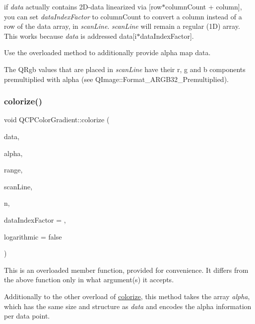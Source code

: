 if {\itshape data} actually contains 2\+D-\/data linearized via {\ttfamily \mbox{[}row$\ast$column\+Count + column\mbox{]}}, you can set {\itshape data\+Index\+Factor} to {\ttfamily column\+Count} to convert a column instead of a row of the data array, in {\itshape scan\+Line}. {\itshape scan\+Line} will remain a regular (1D) array. This works because {\itshape data} is addressed {\ttfamily data\mbox{[}i$\ast$data\+Index\+Factor\mbox{]}}.

Use the overloaded method to additionally provide alpha map data.

The Q\+Rgb values that are placed in {\itshape scan\+Line} have their r, g and b components premultiplied with alpha (see Q\+Image\+::\+Format\+\_\+\+A\+R\+G\+B32\+\_\+\+Premultiplied). \mbox{\label{class_q_c_p_color_gradient_acf0cc7fba83ef21f7b8d5d5258519db3}} 
\subsubsection{\texorpdfstring{colorize()}{colorize()}\hspace{0.1cm}{\footnotesize\ttfamily [2/2]}}
{\footnotesize\ttfamily void Q\+C\+P\+Color\+Gradient\+::colorize (\begin{DoxyParamCaption}\item[{const double $\ast$}]{data,  }\item[{const unsigned char $\ast$}]{alpha,  }\item[{const \hyperlink{class_q_c_p_range}{Q\+C\+P\+Range} \&}]{range,  }\item[{Q\+Rgb $\ast$}]{scan\+Line,  }\item[{int}]{n,  }\item[{int}]{data\+Index\+Factor = {},  }\item[{bool}]{logarithmic = {\ttfamily false} }\end{DoxyParamCaption})}

This is an overloaded member function, provided for convenience. It differs from the above function only in what argument(s) it accepts.

Additionally to the other overload of \hyperlink{class_q_c_p_color_gradient_aaf423ceb943e177b0ed2c48c811d83dc}{colorize}, this method takes the array {\itshape alpha}, which has the same size and structure as {\itshape data} and encodes the alpha information per data point.

